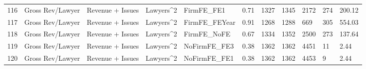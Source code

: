 \begin{table}[ht]
\begin{tabular}{rllllllllll}
  116 & Gross Rev/Lawyer & Revenue + Issues & Lawyers^2 & FirmFE\_FE1 & 0.71 & 1327 & 1345 & 2172 & 274 & 200.12 \\ 
  117 & Gross Rev/Lawyer & Revenue + Issues & Lawyers^2 & FirmFE\_FEYear & 0.91 & 1268 & 1288 & 669 & 305 & 554.03 \\ 
  118 & Gross Rev/Lawyer & Revenue + Issues & Lawyers^2 & FirmFE\_NoFE & 0.67 & 1334 & 1352 & 2500 & 273 & 137.64 \\ 
  119 & Gross Rev/Lawyer & Revenue + Issues & Lawyers^2 & NoFirmFE\_FE3 & 0.38 & 1362 & 1362 & 4451 & 11 & 2.44 \\ 
  120 & Gross Rev/Lawyer & Revenue + Issues & Lawyers^2 & NoFirmFE\_FE1 & 0.38 & 1362 & 1362 & 4453 & 9 & 2.44 \\ 
   \hline
\end{tabular}
\end{table}
